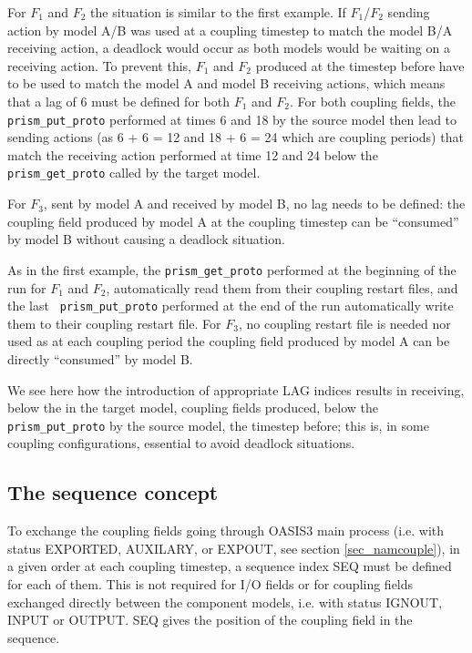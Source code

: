 \begin{enumerate}
  For $F_1$ and $F_2$ the situation is similar to the first
  example. If $F_1$/$F_2$ sending action by model A/B was used at a
  coupling timestep to match the model B/A receiving action, a
  deadlock would occur as both models would be waiting on a receiving
  action. To prevent this, $F_1$ and $F_2$ produced at the timestep
  before have to be used to match the model A and model B receiving
  actions, which means that a lag of 6 must be defined for both $F_1$
  and $F_2$. For both coupling fields, the {\tt prism\_put\_proto}
  performed at times 6 and 18 by the source model then lead to sending
  actions (as 6 + 6 = 12 and 18 + 6 = 24 which are coupling periods)
  that match the receiving action performed at time 12 and 24 below
  the {\tt prism\_get\_proto} called by the target model.

  For $F_3$, sent by model A and received by model B, no lag
  needs to be defined: the coupling field produced by model A at the
  coupling timestep can be ``consumed'' by model B without causing a
  deadlock situation.

  As in the first example, the {\tt prism\_get\_proto} performed at
  the beginning of the run for $F_1$ and $F_2$, automatically read
  them from their coupling restart files, and the last {\tt
  prism\_put\_proto} performed at the end of the run automatically
  write them to their coupling restart file. For $F_3$, no coupling
  restart file is needed nor used as at each coupling period the
  coupling field produced by model A can be directly ``consumed'' by
  model B.

  We see here how the introduction of appropriate LAG indices results in
  receiving, below the  in the target model,
  coupling fields produced, below the {\tt prism\_put\_proto} by the
  source model, the timestep before; this is, in some coupling
  configurations, essential to avoid deadlock situations.

  \end{enumerate}

\subsection{The sequence concept}
 
To exchange the coupling fields going through OASIS3 main process
(i.e. with status EXPORTED, AUXILARY, or EXPOUT, see section
\ref{sec_namcouple}), in a given order at each coupling timestep, a
sequence index SEQ must be defined for each of them. This is not
required for I/O fields or for coupling fields exchanged directly
between the component models, i.e. with status IGNOUT, INPUT or
OUTPUT. SEQ gives the position of the coupling field in the
sequence.

